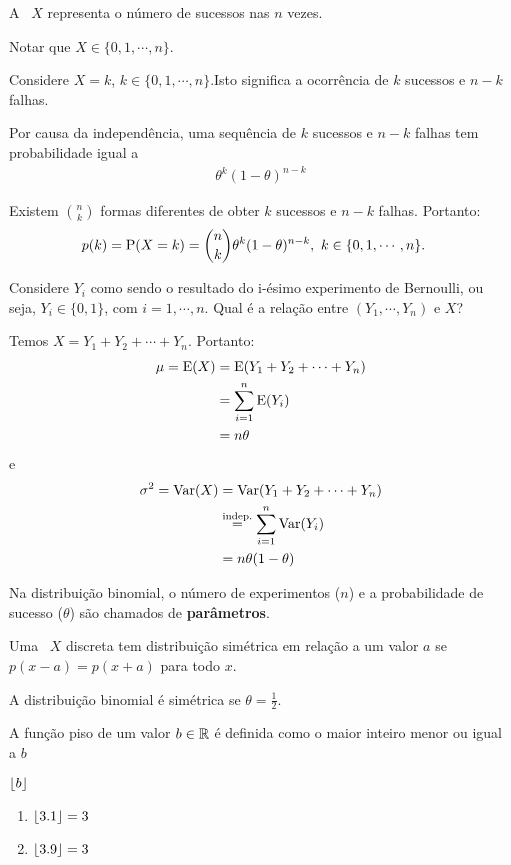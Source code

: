 A \va\ $X$ representa o número de sucessos nas $n$ vezes.

Notar que $X \in \{0, 1, \cdots, n\}$.

Considere $X=k$, $k \in \{0, 1, \cdots, n\}$.Isto significa a ocorrência
de $k$ sucessos e $n-k$ falhas.

Por causa da independência, uma sequência de $k$ sucessos e $n-k$ falhas
tem probabilidade igual a
\begin{align*}
    \theta^k (1-\theta)^{n-k}
\end{align*}

Existem $\binom{n}{k}$ formas diferentes de obter $k$ sucessos e $n-k$ falhas.
Portanto:
\begin{align}
    p(k) = \Prob(X = k) &= \binom{n}{k} \theta^k (1-\theta)^{n-k},\
    k \in \{0, 1, \cdots, n\}.
\end{align}

Considere $Y_i$ como sendo o resultado do i-ésimo experimento de Bernoulli,
ou seja, $Y_i \in \{0,1\}$, com $i=1,\cdots,n$. Qual é a relação
entre $(Y_1,\cdots,Y_n)$ e $X$?

Temos $X = Y_1 + Y_2+\cdots+Y_n$. Portanto:
\begin{align*}
    \mu = \Expected(X) &= \Expected(Y_1 + Y_2+\cdots+Y_n) \\
    &= \sum_{i=1}^n \Expected(Y_i) \\
    &= n\theta
\end{align*}
e
\begin{align*}
    \sigma^2 = \Var(X) &= \Var(Y_1 + Y_2+\cdots+Y_n) \\
    &\overset{\text{indep.}}{=} \sum_{i=1}^n \Var(Y_i) \\
    &= n\theta(1-\theta)
\end{align*}

Na distribuição binomial, o número de experimentos ($n$) e
a probabilidade de sucesso ($\theta$) são chamados de \textbf{parâmetros}.

\begin{definition}
    Uma \va\ $X$ discreta tem distribuição simétrica em relação
    a um valor $a$ se $p(x - a) = p(x + a)$ para todo $x$.
\end{definition}

\begin{property}
    A distribuição binomial é simétrica se $\theta = \frac{1}{2}$.
\end{property}

\begin{definition}
    A função piso de um valor $b \in \R$ é definida como
    o maior inteiro menor ou igual a $b$

    \begin{notation}
        $\floor*{b}$
    \end{notation}
    \begin{example}
        \begin{enumerate}[label=(\alph*)]
            \item $\floor*{3.1} = 3$
            \item $\floor*{3.9} = 3$
        \end{enumerate}
    \end{example}
\end{definition}

